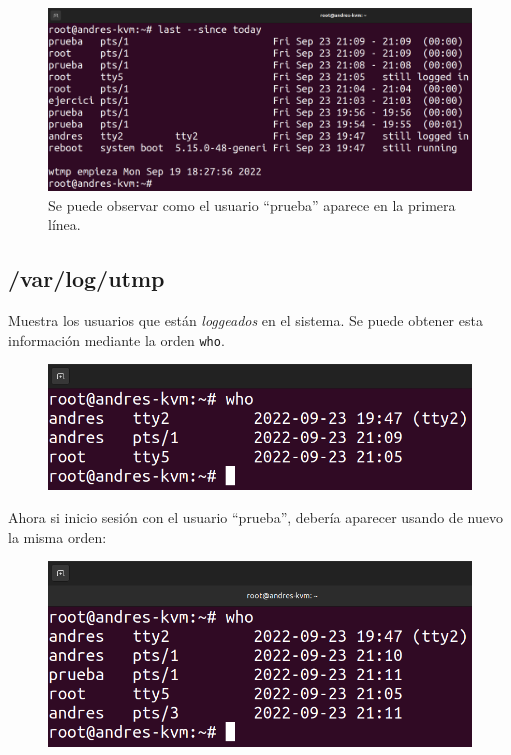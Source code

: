 \documentclass{article}
\begin{document}
\begin{figure}[H]
    \includegraphics[width=\textwidth]{imagenes/lasttodayprueba.png}
    \caption{Se puede observar como el usuario ``prueba'' aparece en la primera línea.}
\end{figure}

\subsection*{/var/log/utmp}
Muestra los usuarios que están \textit{loggeados} en el sistema. Se puede obtener esta información mediante la orden \verb|who|.

\begin{figure}[H]
    \includegraphics[width=\textwidth]{imagenes/whonormal.png}
\end{figure}

\bigskip

Ahora si inicio sesión con el usuario ``prueba'', debería aparecer usando de nuevo la misma orden:

\begin{figure}[H]
    \includegraphics[width=\textwidth]{imagenes/whoprueba.png}
\end{figure}
\end{document}
